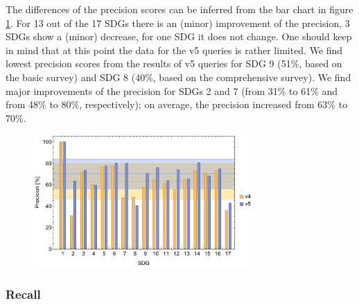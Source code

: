 \documentclass{article}
\begin{document}
The differences of the precision scores can be inferred from the bar chart in figure \ref{precisionbarchart}. For 13 out of the 17 SDGs there is an (minor) improvement of the precision, 3 SDGs show a (minor) decrease, for one SDG it does not change. One should keep in mind that at this point the data for the v5 queries is rather limited.
We find lowest precision scores from the results of v5 queries for SDG 9 (51\%, based on the basic survey) and SDG 8 (40\%, based on the comprehensive survey). We find major improvements of the precision for SDGs 2 and 7 (from 31\% to 61\% and from 48\% to 80\%, respectively); on average, the precision increased from 63\% to 70\%.
\begin{figure}[H]
	\centering
  \includegraphics[width=0.75\textwidth]{figures/precisionbarchart.pdf}
	\caption{
}
	\label{precisionbarchart}
\end{figure}

\subsubsection{Recall}
\end{document}
